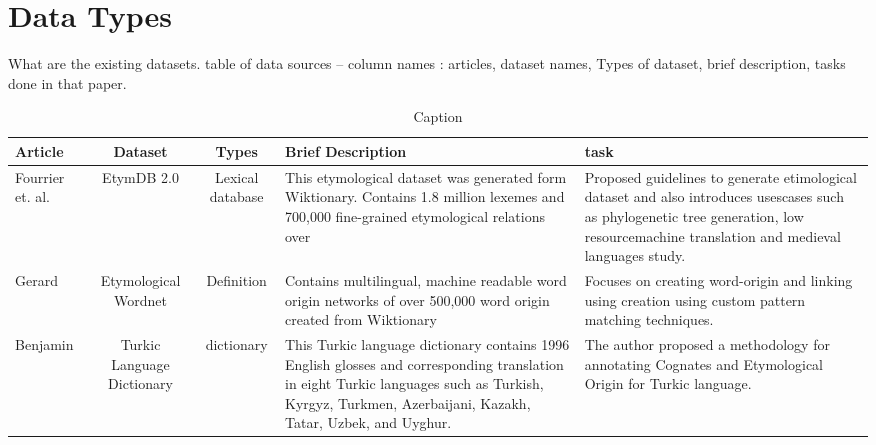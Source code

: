 \section{Data Types}
What are the existing datasets. table of data sources -- column names :
articles, dataset names, Types of dataset, brief description, tasks done in that
paper.

\begin{table}
    \centering
    \begin{tabular}{|p{1cm}|c|c|p{4cm}|p{3cm}|}\hline
        Article                                              & Dataset                    & Types            & Brief Description                                                                                                                                                                                       & task                                                                                                                                                                                   \\
        \hline
        Fourrier et. al. \cite{fourrier_methodological_2020} & EtymDB 2.0                 & Lexical database & This etymological dataset was generated form Wiktionary. Contains 1.8 million lexemes and 700,000 fine-grained etymological relations over                                                              & Proposed guidelines to generate etimological dataset and also introduces usescases such as phylogenetic tree generation, low resourcemachine translation and medieval languages study. \\
        \hline
        Gerard \cite{demelo_etymological_2014}               & Etymological Wordnet       & Definition       & Contains multilingual, machine readable word origin networks of over  500,000 word origin created from Wiktionary                                                                                       & Focuses on creating word-origin and linking using creation using custom pattern matching techniques.                                                                                   \\
        \hline
        Benjamin \cite{mericli_annotating_2015}              & Turkic Language Dictionary & dictionary       & This Turkic language dictionary contains 1996 English glosses and corresponding translation in eight Turkic languages such as  Turkish, Kyrgyz, Turkmen, Azerbaijani, Kazakh, Tatar, Uzbek, and Uyghur. & The author proposed a methodology for annotating Cognates and Etymological Origin for Turkic language.                                                                                 \\
        \hline
    \end{tabular}
    \caption{Caption}
    \label{tab:datatypes}
\end{table}
